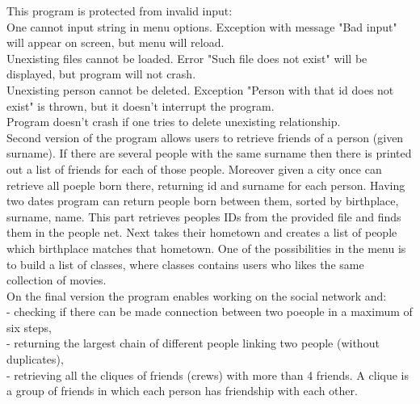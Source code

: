 \documentclass[twoside]{book}
\newcommand{\+}{\discretionary{\mbox{\scriptsize$\hookleftarrow$}}{}{}}
\begin{document}
This program is protected from invalid input:\\
One cannot input string in menu options. Exception with message "Bad input" will appear on screen, but menu will reload.\\
Unexisting files cannot be loaded. Error "Such file does not exist" will be displayed, but program will not crash.\\
Unexisting person cannot be deleted. Exception "Person with that id does not exist" is thrown, but it doesn't interrupt the program.\\
Program doesn't crash if one tries to delete unexisting relationship.\\

Second version of the program allows users to retrieve friends of a person (given surname). If there are several people with the same surname then there is printed out a list of friends for each of those people.
Moreover given a city once can retrieve all poeple born there, returning id and surname for each person.
Having two dates program can return people born between them, sorted by birthplace, surname, name.
This part retrieves peoples IDs from the provided file and finds them in the people net. Next takes their hometown and creates a list of people which birthplace matches that hometown.
One of the possibilities in the menu is to build a list of classes, where classes contains users who likes the same collection of movies.\\

On the final version the program enables working on the social network and:\\
- checking if there can be made connection between two poeople in a maximum of six steps,\\
- returning the largest chain of different people linking two people (without duplicates),\\
- retrieving all the cliques of friends (crews) with more than 4 friends. A clique is a group of friends in which each person has friendship with each other.
\end{document}
